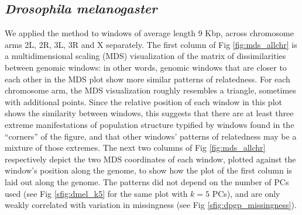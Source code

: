 \documentclass[11pt, oneside]{article}   	%
\newcommand{\Figure}{Fig }
\newcommand{\Figure}{{Figure }}
\renewcommand{\revpoint}[2]{\relax}
\begin{document}
\subsection{\textit{Drosophila melanogaster}}

We applied the method to windows of average length 9 Kbp, across chromosome arms 2L, 2R, 3L, 3R and X separately.
The first column of \Figure \ref{fig:mds_allchr} is a multidimensional scaling (MDS) visualization 
of the matrix of dissimilarities between genomic windows:
in other words, genomic windows that are closer to each other in the MDS plot show more similar patterns of relatedness.
For each chromosome arm, the MDS visualization roughly resembles a triangle,
sometimes with additional points.
Since the relative position of each window in this plot shows the similarity between windows, 
this suggests that there are at least three extreme manifestations of population structure 
typified by windows found in the ``corners'' of the figure,
and that other windows' patterns of relatedness may be a mixture of those extremes. 
The next two columns of \Figure \ref{fig:mds_allchr} respectively depict the two MDS coordinates of each window,
plotted against the window's position along the genome,
to show how the plot of the first column is laid out along the genome.
The patterns did not depend on the number of PCs used
(see \Figure \ref{sfig:dmel_k5} for the same plot with $k=5$ PCs), \revpoint{1}{3}
and are only weakly correlated with variation in missingness 
(see \Figure \ref{sfig:dpgp_missingness}). \revpoint{2}{4}
\end{document}
